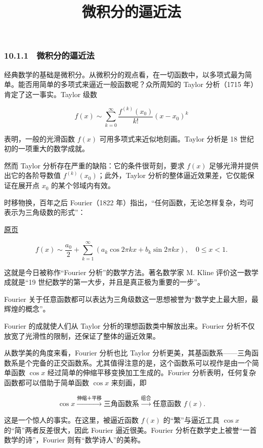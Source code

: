 \documentclass[
  10pt,
  fontset=fandol]{ctexart}
\title{微积分的逼近法}
\author{}
\date{}
\begin{document}
\maketitle

\subsubsection{10.1.1　微积分的逼近法}\label{ux5faeux79efux5206ux7684ux903cux8fd1ux6cd5}

经典数学的基础是微积分。从微积分的观点看，在一切函数中，以多项式最为简单。能否用简单的多项式来逼近一般函数呢？众所周知的 Taylor 分析（1715 年）肯定了这一事实。Taylor 级数

\[
f(x)\sim\sum_{k=0}^{\infty}\frac{f^{(k)}(x_0)}{k!}(x-x_0)^k
\]

表明，一般的光滑函数 \(f(x)\) 可用多项式来近似地刻画。Taylor 分析是 18 世纪初的一项重大的数学成就。

然而 Taylor 分析存在严重的缺陷：它的条件很苛刻，要求 \(f(x)\) 足够光滑并提供出它的各阶导数值 \(f^{(k)}(x_0)\)；此外，Taylor 分析的整体逼近效果差，它仅能保证在展开点 \(x_0\) 的某个邻域内有效。

时移物换，百年之后 Fourier（1822 年）指出，``任何函数，无论怎样复杂，均可表示为三角级数的形式''：

\href{../../source-images/pdf-262.jpeg}{原页}

\[
f(x)\sim\frac{a_0}{2}+\sum_{k=1}^{\infty}(a_k\cos2\pi kx+b_k\sin2\pi kx),\quad 0\leqslant x<1.
\]

这就是今日被称作``Fourier 分析''的数学方法。著名数学家 M. Kline 评价这一数学成就是``19 世纪数学的第一大步，并且是真正极为重要的一步''。

Fourier 关于任意函数都可以表达为三角级数这一思想被誉为``数学史上最大胆，最辉煌的概念''。

Fourier 的成就使人们从 Taylor 分析的理想函数类中解放出来。Fourier 分析不仅放宽了光滑性的限制，还保证了整体的逼近效果。

从数学美的角度来看，Fourier 分析也比 Taylor 分析更美，其基函数系------三角函数系是个完备的正交函数系。尤其值得注意的是，这个函数系可以视作是由一个简单函数 \(\cos x\) 经过简单的伸缩平移变换加工生成的。Fourier 分析表明，任何复杂函数都可以借助于简单函数 \(\cos x\) 来刻画，即

\[
\cos x\xrightarrow{\text{伸缩＋平移}}\text{三角函数系}\xrightarrow{\text{组合}}\text{任意函数 }f(x).
\]

这是一个惊人的事实。在这里，被逼近函数 \(f(x)\) 的``繁''与逼近工具 \(\cos x\) 的``简''两者反差很大，因此 Fourier 逼近很美。Fourier 分析在数学史上被誉``一首数学的诗''，Fourier 则有``数学诗人''的美称。
\end{document}
